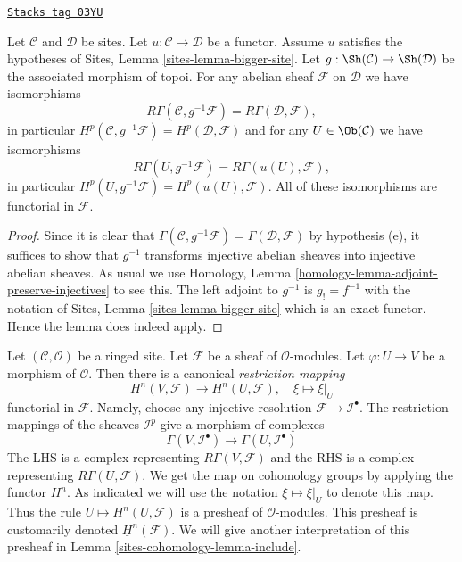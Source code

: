 \begin{lemma}
\label{sites-cohomology-lemma-cohomology-bigger-site}
\href{https://stacks.math.columbia.edu/tag/03YU}{\texttt{Stacks tag 03YU}}

Let $\mathcal{C}$ and $\mathcal{D}$ be sites.
Let $u : \mathcal{C} \to \mathcal{D}$ be a functor.
Assume $u$ satisfies the hypotheses of
Sites, Lemma \ref{sites-lemma-bigger-site}.
Let $g : \Sh(\mathcal{C}) \to \Sh(\mathcal{D})$
be the associated morphism of topoi.
For any abelian sheaf $\mathcal{F}$ on $\mathcal{D}$ we have
isomorphisms
$$
R\Gamma(\mathcal{C}, g^{-1}\mathcal{F}) = R\Gamma(\mathcal{D}, \mathcal{F}),
$$
in particular
$H^p(\mathcal{C}, g^{-1}\mathcal{F}) = H^p(\mathcal{D}, \mathcal{F})$
and for any $U \in \Ob(\mathcal{C})$ we have isomorphisms
$$
R\Gamma(U, g^{-1}\mathcal{F}) = R\Gamma(u(U), \mathcal{F}),
$$
in particular
$H^p(U, g^{-1}\mathcal{F}) = H^p(u(U), \mathcal{F})$. All of these
isomorphisms are functorial in $\mathcal{F}$.
\end{lemma}

\begin{proof}
Since it is clear that
$\Gamma(\mathcal{C}, g^{-1}\mathcal{F}) = \Gamma(\mathcal{D}, \mathcal{F})$
by hypothesis (e), it suffices to show that $g^{-1}$ transforms injective
abelian sheaves into injective abelian sheaves. As usual we use
Homology, Lemma \ref{homology-lemma-adjoint-preserve-injectives}
to see this. The left adjoint to $g^{-1}$ is $g_! = f^{-1}$ with the
notation of
Sites, Lemma \ref{sites-lemma-bigger-site}
which is an exact functor. Hence the lemma does indeed apply.
\end{proof}

Let $(\mathcal{C}, \mathcal{O})$ be a ringed site.
Let $\mathcal{F}$ be a sheaf of $\mathcal{O}$-modules.
Let $\varphi : U \to V$ be a morphism of $\mathcal{O}$.
Then there is a canonical {\it restriction mapping}
\begin{equation}
\label{equation-restriction-mapping}
H^n(V, \mathcal{F})
\longrightarrow
H^n(U, \mathcal{F}), \quad
\xi \longmapsto \xi|_U
\end{equation}
functorial in $\mathcal{F}$. Namely, choose any injective
resolution $\mathcal{F} \to \mathcal{I}^\bullet$. The restriction
mappings of the sheaves $\mathcal{I}^p$ give a morphism of complexes
$$
\Gamma(V, \mathcal{I}^\bullet)
\longrightarrow
\Gamma(U, \mathcal{I}^\bullet)
$$
The LHS is a complex representing $R\Gamma(V, \mathcal{F})$
and the RHS is a complex representing $R\Gamma(U, \mathcal{F})$.
We get the map on cohomology groups by applying the functor $H^n$.
As indicated we will use the notation $\xi \mapsto \xi|_U$ to denote this map.
Thus the rule $U \mapsto H^n(U, \mathcal{F})$ is a presheaf of
$\mathcal{O}$-modules. This presheaf is customarily denoted
$\underline{H}^n(\mathcal{F})$. We will give another interpretation
of this presheaf in Lemma \ref{sites-cohomology-lemma-include}.

